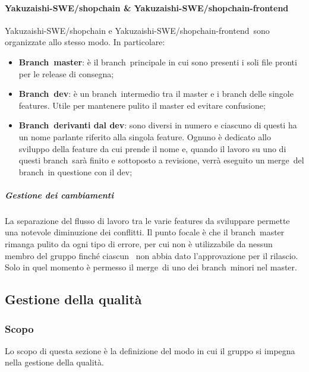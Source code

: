         \paragraph{Yakuzaishi-SWE/shopchain \& Yakuzaishi-SWE/shopchain-frontend\glo}
        Yakuzaishi-SWE/shopchain e Yakuzaishi-SWE/shopchain-frontend\glo\ sono organizzate allo stesso modo. In particolare:
        \begin{itemize}
            \item \textbf{Branch\glo\ master}: è il branch\glo\ principale in cui sono presenti i soli file pronti per le release di consegna;
            \item \textbf{Branch\glo\ dev}: è un branch\glo\ intermedio tra il master e i branch delle singole features. Utile per mantenere pulito il master ed evitare confusione;
            \item \textbf{Branch\glo\ derivanti dal dev}: sono diversi in numero e ciascuno di questi ha un nome parlante riferito alla singola feature. Ognuno è dedicato allo sviluppo della feature da cui prende il nome e, quando il lavoro su uno di questi branch\glo\ sarà finito e sottoposto a revisione, verrà eseguito un merge\glo\ del branch\glo\ in questione con il dev;
        \end{itemize}

        \subparagraph{Gestione dei cambiamenti}
        La separazione del flusso di lavoro tra le varie features da sviluppare permette una notevole diminuzione dei conflitti. Il punto focale è che il branch\glo\ master rimanga pulito da ogni tipo di errore, per cui non è utilizzabile da nessun membro del gruppo finché ciascun \roleProjectManagerLow\ non abbia dato l’approvazione per il rilascio. Solo in quel momento è permesso il merge\glo\ di uno dei branch\glo\ minori nel master.

\vspace{2cm}

\subsection{Gestione della qualità}\label{subsection: gestione_qualita}
\subsubsection{Scopo}
Lo scopo di questa sezione è la definizione del modo in cui il gruppo si impegna nella gestione della qualità.
